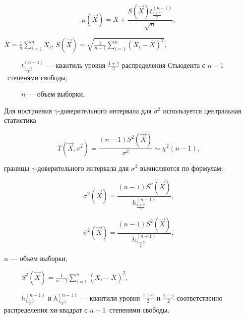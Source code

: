 \begin{equation}
	\label{eq:mu_upper}
	\overline \mu (\vec X) = \overline X + \frac{S(\vec X)t^{(n-1)}_{\frac{1 +
				\gamma}{2}}}{\sqrt n},
\end{equation}


 $\overline X = \frac{1}{n} \sum\limits_{i=1}^{n} X_i$, $S(\vec X) = \sqrt{\frac{1}{n-1} \sum\limits_{i=1}^{n} (X_i - \overline X)^2}$,

\noindent~~~~~$t_{\frac{1+\gamma}{2}}^{(n-1)}$ --- квантиль уровня $\frac{1+\gamma}{2}$ распределения Стьюдента с \mbox{$n-1$~степенями} свободы,

\noindent~~~~~$n$ --- объем выборки.

Для построения $\gamma$-доверительного интервала для $\sigma^2$ используется
центральная статистика

\begin{equation}
	\label{eq:T_2}
	T(\vec X, \sigma^2) = \frac{(n-1)S^2(\vec X)}{\sigma^2} \sim \chi^2(n - 1),
\end{equation}

 границы $\gamma$-доверительного интервала для $\sigma^2$ вычисляются по
формулам:

\begin{equation}
	\label{eq:S_quad_lower}
	\underline \sigma^2 (\vec X) = \frac{(n-1)S^2(\vec X)}{h_{\frac{1+\gamma}{2}}^{(n-1)}},
\end{equation}

\begin{equation}
	\label{eq:S_quad_upper}
	\overline \sigma^2 (\vec X) = \frac{(n-1)S^2(\vec X)}{h_{\frac{1-\gamma}{2}}^{(n-1)}},
\end{equation}


 $n$ --- объем выборки,

\noindent~~~~~$S^2(\vec X) = \frac{1}{n-1} \sum\limits_{i=1}^{n} (X_i -
\overline X)^2$,

\noindent~~~~~$h_{\frac{1+\gamma}{2}}^{(n-1)}$ и $h_{\frac{1-\gamma}{2}}^{(n-1)}$ --- квантили уровня $\frac{1+\gamma}{2}$ и $\frac{1-\gamma}{2}$ соответственно распределения хи-квадрат с \mbox{$n-1$~степенями} свободы.